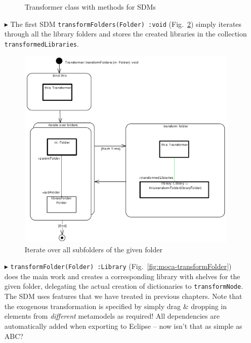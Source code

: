 \begin{enumerate}
\begin{figure}[!htbp]
\begin{center}
  \caption{Transformer class with methods for SDMs}
  \label{fig:moca-DictionaryCodeAdapter}
\end{center}
\end{figure}
\item[$\blacktriangleright$] The first SDM \texttt{transformFolders(Folder)~:void} (Fig.~\ref{fig:moca-transformFolders}) simply iterates through all the library folders and stores the created libraries in the collection \texttt{transformedLibraries}.
\begin{figure}[!htbp]
\begin{center}
 \includegraphics[width=\textwidth]{pics/moca/3MocaTreeToModel/transformFolders}
  \caption{Iterate over all subfolders of the given folder}
  \label{fig:moca-transformFolders}
\end{center}
\end{figure}
\item[$\blacktriangleright$]  \texttt{transformFolder(Folder)~:Library} (Fig.~\ref{fig:moca-transformFolder}) does the main work and creates a corresponding library with shelves for the given folder, delegating the actual creation of dictionaries to \texttt{transformNode}.
The SDM uses features that we have treated in previous chapters.
Note that the exogenous transformation is specified by simply drag \& dropping in elements from \emph{different} metamodels as required!
All dependencies are automatically added when exporting to Eclipse -- now isn't that as simple as ABC?

\end{enumerate}
